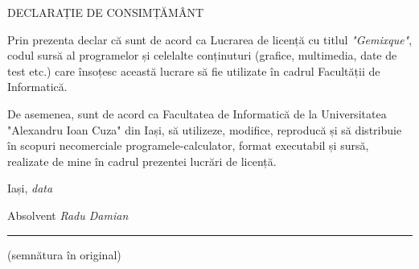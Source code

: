 \documentclass[12pt,a4paper]{report}
\newcommand\myrepeat[2]{%
  \begingroup
  \lccode`m=`#2\relax
  \lowercase\expandafter{\romannumeral#1000}%
  \endgroup
}
\begin{document}

\begin{titlepage}
	\hfill \break
	\begin{center}
	DECLARAȚIE DE CONSIMȚĂMÂNT
	\end{center}
	
	\hfill \break
	\justifying
	Prin prezenta declar că sunt de acord ca Lucrarea de
	licență cu titlul \emph{"Gemixque"},
	codul sursă al programelor și celelalte conținuturi
	(grafice, multimedia, date de test etc.) care însoțesc
	această lucrare să fie utilizate în cadrul Facultății
	de Informatică.
	
	De asemenea, sunt de acord ca Facultatea de Informatică
	de la Universitatea "Alexandru Ioan Cuza" din Iași,
	să utilizeze, modifice, reproducă și să distribuie în
	scopuri necomerciale programele-calculator, format
	executabil și sursă, realizate de mine în cadrul prezentei
	lucrări de licență.
	
	\hfill \break
	\hfill \break
	\hfill \break
	\hfill \break
	\hfill \break
	Iași, \emph{data}
	
	\hfill \break
	\hfill \break
	\hfill \break
	\hfill \break
	\hfill \break
	\begin{FlushRight}Absolvent  \emph{Radu Damian} \end{FlushRight}
	\begin{FlushRight}\rule{4.5cm}{0.15mm} \end{FlushRight}
	\begin{FlushRight}(semnătura în original) \end{FlushRight}
	
	
\end{titlepage}
\end{document}
